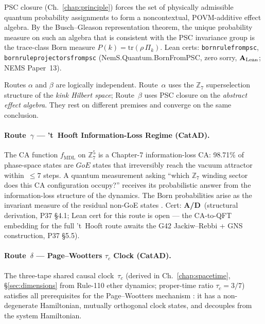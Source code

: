 \documentclass[11pt,openany]{book}
\theoremstyle{remark}
\newcommand{\MDL}{\text{MDL}}
\newcommand{\lean}[1]{%
  \penalty-100
  \begingroup\def\_{\textunderscore\allowbreak}\texttt{#1}\endgroup}
\newcommand{\CatAL}{\ensuremath{\textbf{A}_{\rm Lean}}}
\newcommand{\CatAD}{\textbf{A/D}}
\begin{document}
PSC closure (Ch.~\ref{chap:principle}) forces the set of physically admissible
quantum probability assignments to form a noncontextual, POVM-additive effect
algebra.  By the Busch--Gleason representation theorem, the unique
probability measure on such an algebra that is consistent with the PSC invariance
group is the trace-class Born measure $P(k) = \mathrm{tr}(\rho\,\Pi_k)$.
Lean certs: \lean{born\_rule\_from\_psc}, \lean{born\_rule\_projectors\_from\_psc}
(NemS.Quantum.BornFromPSC, zero sorry, \CatAL; NEMS Paper~13).

Routes $\alpha$ and $\beta$ are logically independent.  Route~$\alpha$ uses the
$\mathbb{Z}_7$ superselection structure of the \emph{kink Hilbert space}; Route~$\beta$
uses PSC closure on the \emph{abstract effect algebra}.  They rest on different premises
and converge on the same conclusion.

\paragraph{Route~$\gamma$ --- 't~Hooft Information-Loss Regime (CatAD).}

The CA function $f_{\MDL}$ on $\mathbb{Z}_7^5$ is a Chapter-7 information-loss
CA: 98.71\% of phase-space states are $\mathit{GoE}$ states that irreversibly
reach the vacuum attractor within~$\leq 7$ steps.  A quantum measurement asking
``which $\mathbb{Z}_7$ winding sector does this CA configuration occupy?'' receives
its probabilistic answer from the information-loss structure of the dynamics.  The
Born probabilities arise as the invariant measure of the residual non-GoE states
\cite{SpivackQMFromR110}.
Cert: \CatAD\ (structural derivation, P37 §4.1; Lean cert for this route is open ---
the CA-to-QFT embedding for the full 't~Hooft route awaits the G42 Jackiw--Rebbi +
GNS construction, P37 §5.5).

\paragraph{Route~$\delta$ --- Page--Wootters $\tau_c$ Clock (CatAD).}

The three-tape shared causal clock~$\tau_c$ (derived in Ch.~\ref{chap:spacetime},
§\ref{sec:dimensions} from Rule-110 ether dynamics; proper-time ratio $\tau_c = 3/7$)
satisfies all prerequisites for the Page--Wootters mechanism
\cite{PageWootters1983}: it has a non-degenerate Hamiltonian, mutually
orthogonal clock states, and decouples from the system Hamiltonian.
\end{document}
